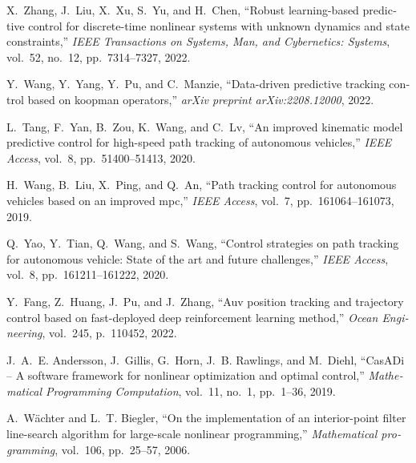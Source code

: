 \documentclass[12pt,a4paper]{report}
\begin{document}
\begin{thebibliography}{10}
\begin{latin}
		X.~Zhang, J.~Liu, X.~Xu, S.~Yu, and H.~Chen, ``Robust learning-based predictive
		control for discrete-time nonlinear systems with unknown dynamics and state
		constraints,'' {\em IEEE Transactions on Systems, Man, and Cybernetics:
			Systems}, vol.~52, no.~12, pp.~7314--7327, 2022.
		
		Y.~Wang, Y.~Yang, Y.~Pu, and C.~Manzie, ``Data-driven predictive tracking
		control based on koopman operators,'' {\em arXiv preprint arXiv:2208.12000},
		2022.
		
		L.~Tang, F.~Yan, B.~Zou, K.~Wang, and C.~Lv, ``An improved kinematic model
		predictive control for high-speed path tracking of autonomous vehicles,''
		{\em IEEE Access}, vol.~8, pp.~51400--51413, 2020.
		
		H.~Wang, B.~Liu, X.~Ping, and Q.~An, ``Path tracking control for autonomous
		vehicles based on an improved mpc,'' {\em IEEE Access}, vol.~7,
		pp.~161064--161073, 2019.
		
		Q.~Yao, Y.~Tian, Q.~Wang, and S.~Wang, ``Control strategies on path tracking
		for autonomous vehicle: State of the art and future challenges,'' {\em IEEE
			Access}, vol.~8, pp.~161211--161222, 2020.
		
		Y.~Fang, Z.~Huang, J.~Pu, and J.~Zhang, ``Auv position tracking and trajectory
		control based on fast-deployed deep reinforcement learning method,'' {\em
			Ocean Engineering}, vol.~245, p.~110452, 2022.
		
		J.~A.~E. Andersson, J.~Gillis, G.~Horn, J.~B. Rawlings, and M.~Diehl,
		``{CasADi} -- {A} software framework for nonlinear optimization and optimal
		control,'' {\em Mathematical Programming Computation}, vol.~11, no.~1,
		pp.~1--36, 2019.
		
		A.~W{\"a}chter and L.~T. Biegler, ``On the implementation of an interior-point
		filter line-search algorithm for large-scale nonlinear programming,'' {\em
			Mathematical programming}, vol.~106, pp.~25--57, 2006.
		\end{latin}
		
	\end{thebibliography}
	
	
	
\end{document}
